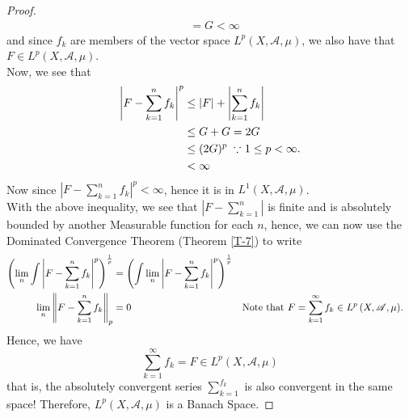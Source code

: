 \documentclass{article}
\theoremstyle{definition}
\theoremstyle{remark}
\theoremstyle{definition}
\theoremstyle{definition}
\theoremstyle{definition}
\newcommand{\abs}[1]{\left \vert #1\right \vert}
\newcommand{\norm}[1]{\left \Vert #1 \right \Vert}
\newcommand{\alg}[1]{\mathscr{#1}}
\newcommand{\Lp}[1]{L^{p}\left (#1\right )}
\newcommand{\LS}[2]{L^{#1}\left (#2\right )}
\begin{document}
\begin{proof}
\begin{align*}
	&= G < \infty
\end{align*}
and since $ f_k $ are members of the vector space $ \Lp{X,\alg{A},\mu} $, we also have that $ F \in \Lp{X,\alg{A},\mu} $.\\
Now, we see that
\begin{align*}
	\abs{F - \sum_{k=1}^{n}f_k}^{p} &\le \abs{F} + \abs{\sum_{k=1}^{n}f_k}\\
	&\le G + G = 2G\\
	&\le (2G)^{p} \;\;\text{$ \because $ $ 1\le p < \infty $.}\\
	&< \infty
\end{align*}
Now since $ \abs{F - \sum_{k=1}^{n} f_k}^{p} < \infty$, hence it is in $ \LS{1}{X,\alg{A},\mu} $.\\
With the above inequality, we see that $ \abs{F - \sum_{k=1}^{n}} $ is finite and is absolutely bounded by another Measurable function for each $ n $, hence, we can now use the Dominated Convergence Theorem (Theorem \ref{T-7}) to write 
\begin{align*}
	\left (\lim_{n} \int \abs{F - \sum_{k=1}^{n}f_k}^{p}\right )^{\frac{1}{p}} &= \left (\int \lim_{n} \abs{F - \sum_{k=1}^{n}f_k}^{p}\right )^{\frac{1}{p}}\\
\lim_{n}\norm{F- \sum_{k=1}^{n}f_k}_p	&= 0&&\text{Note that $ F = \sum_{k=1}^{\infty} f_k \in  \Lp{X,\alg{A},\mu}$.}
\end{align*}
Hence, we have
\[\sum_{k=1}^{\infty} f_k = F \in \Lp{X,\alg{A},\mu}\]
that is, the absolutely convergent series $ \sum_{k=1}^{f_k} $ is also convergent in the same space! Therefore, $ \Lp{X,\alg{A},\mu} $ is a Banach Space. 
 \end{proof}
\hrulefill
\newpage
\end{document}
